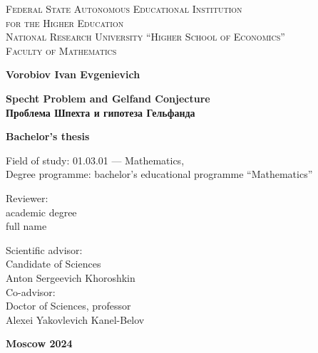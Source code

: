 \documentclass[12pt,a4paper]{article}
\begin{document}
    \thispagestyle{empty}

    \begin{center}
    {\scshape Federal State Autonomous Educational Institution\\
    for the Higher Education\\
    National Research University ``Higher School of Economics''\\[1ex]
    Faculty of Mathematics\par}

        \par\vfill

        \textbf{\large Vorobiov Ivan Evgenievich}

        \vspace{1.5cm}

        {\Large\bfseries
        Specht Problem and Gelfand Conjecture\\
        Проблема Шпехта и гипотеза Гельфанда
        \par}

        \vspace{1.5cm}

        \textbf{\large Bachelor's thesis}


        \vspace{1cm}

        Field of study: 01.03.01 --- Mathematics,\\[1ex]
        Degree programme: bachelor's educational programme ``Mathematics''


        \par\vfill
        \noindent\parbox[t]{0.48\textwidth}{%
            Reviewer:\\[3pt]
            academic degree\\
            full name
        }\hspace{0.04\textwidth}\parbox[t]{0.48\textwidth}{%
            Scientific advisor:\\[3pt]
            Candidate of Sciences\\
            Anton Sergeevich Khoroshkin\\[3pt]
            Co-advisor:\\[3pt]
            Doctor of Sciences, professor\\
            Alexei Yakovlevich Kanel-Belov\\
        }%
        \par\vfill\vfill
        \textbf{Moscow 2024}
    \end{center}
    \thispagestyle{empty}
    \pagebreak
\end{document}
